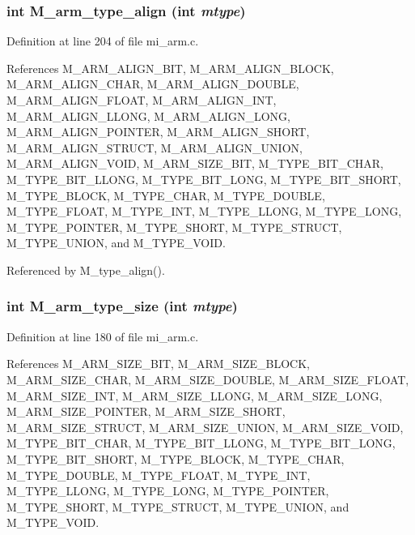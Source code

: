 \subsubsection{\setlength{\rightskip}{0pt plus 5cm}int M\_\-arm\_\-type\_\-align (int {\em mtype})}\label{m__arm_8h_dc3556a0bdbdd20965867036bbe7204a}




Definition at line 204 of file mi\_\-arm.c.

References M\_\-ARM\_\-ALIGN\_\-BIT, M\_\-ARM\_\-ALIGN\_\-BLOCK, M\_\-ARM\_\-ALIGN\_\-CHAR, M\_\-ARM\_\-ALIGN\_\-DOUBLE, M\_\-ARM\_\-ALIGN\_\-FLOAT, M\_\-ARM\_\-ALIGN\_\-INT, M\_\-ARM\_\-ALIGN\_\-LLONG, M\_\-ARM\_\-ALIGN\_\-LONG, M\_\-ARM\_\-ALIGN\_\-POINTER, M\_\-ARM\_\-ALIGN\_\-SHORT, M\_\-ARM\_\-ALIGN\_\-STRUCT, M\_\-ARM\_\-ALIGN\_\-UNION, M\_\-ARM\_\-ALIGN\_\-VOID, M\_\-ARM\_\-SIZE\_\-BIT, M\_\-TYPE\_\-BIT\_\-CHAR, M\_\-TYPE\_\-BIT\_\-LLONG, M\_\-TYPE\_\-BIT\_\-LONG, M\_\-TYPE\_\-BIT\_\-SHORT, M\_\-TYPE\_\-BLOCK, M\_\-TYPE\_\-CHAR, M\_\-TYPE\_\-DOUBLE, M\_\-TYPE\_\-FLOAT, M\_\-TYPE\_\-INT, M\_\-TYPE\_\-LLONG, M\_\-TYPE\_\-LONG, M\_\-TYPE\_\-POINTER, M\_\-TYPE\_\-SHORT, M\_\-TYPE\_\-STRUCT, M\_\-TYPE\_\-UNION, and M\_\-TYPE\_\-VOID.

Referenced by M\_\-type\_\-align().
\subsubsection{\setlength{\rightskip}{0pt plus 5cm}int M\_\-arm\_\-type\_\-size (int {\em mtype})}\label{m__arm_8h_641c221c693874cea281eb1f49bd75ec}




Definition at line 180 of file mi\_\-arm.c.

References M\_\-ARM\_\-SIZE\_\-BIT, M\_\-ARM\_\-SIZE\_\-BLOCK, M\_\-ARM\_\-SIZE\_\-CHAR, M\_\-ARM\_\-SIZE\_\-DOUBLE, M\_\-ARM\_\-SIZE\_\-FLOAT, M\_\-ARM\_\-SIZE\_\-INT, M\_\-ARM\_\-SIZE\_\-LLONG, M\_\-ARM\_\-SIZE\_\-LONG, M\_\-ARM\_\-SIZE\_\-POINTER, M\_\-ARM\_\-SIZE\_\-SHORT, M\_\-ARM\_\-SIZE\_\-STRUCT, M\_\-ARM\_\-SIZE\_\-UNION, M\_\-ARM\_\-SIZE\_\-VOID, M\_\-TYPE\_\-BIT\_\-CHAR, M\_\-TYPE\_\-BIT\_\-LLONG, M\_\-TYPE\_\-BIT\_\-LONG, M\_\-TYPE\_\-BIT\_\-SHORT, M\_\-TYPE\_\-BLOCK, M\_\-TYPE\_\-CHAR, M\_\-TYPE\_\-DOUBLE, M\_\-TYPE\_\-FLOAT, M\_\-TYPE\_\-INT, M\_\-TYPE\_\-LLONG, M\_\-TYPE\_\-LONG, M\_\-TYPE\_\-POINTER, M\_\-TYPE\_\-SHORT, M\_\-TYPE\_\-STRUCT, M\_\-TYPE\_\-UNION, and M\_\-TYPE\_\-VOID.

